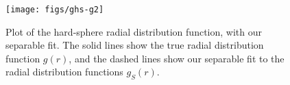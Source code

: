 \documentclass[letterpaper,twocolumn,amsmath,amssymb,pre,aps,10pt]{revtex4-1}
\newcommand{\rr}{\textbf{r}}
\begin{document}
\begin{figure}
  \centering
  \texttt{[image: figs/ghs-g2]}%
  \caption{Plot of the hard-sphere radial distribution function, with
    our separable fit.  The solid lines show the true radial
    distribution function $g(r)$, and the dashed lines show our
    separable fit to the radial distribution functions
    $g_S(r)$.}\label{fig:radial-distribution}
\end{figure}
\end{document}
